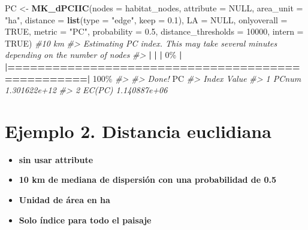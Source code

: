 \documentclass[
]{book}
\newenvironment{Shaded}{\begin{snugshade}}{\end{snugshade}}
\newcommand{\AttributeTok}[1]{\textcolor[rgb]{0.13,0.29,0.53}{#1}}
\newcommand{\CommentTok}[1]{\textcolor[rgb]{0.56,0.35,0.01}{\textit{#1}}}
\newcommand{\ConstantTok}[1]{\textcolor[rgb]{0.56,0.35,0.01}{#1}}
\newcommand{\DecValTok}[1]{\textcolor[rgb]{0.00,0.00,0.81}{#1}}
\newcommand{\ErrorTok}[1]{\textcolor[rgb]{0.64,0.00,0.00}{\textbf{#1}}}
\newcommand{\FloatTok}[1]{\textcolor[rgb]{0.00,0.00,0.81}{#1}}
\newcommand{\FunctionTok}[1]{\textcolor[rgb]{0.13,0.29,0.53}{\textbf{#1}}}
\newcommand{\NormalTok}[1]{#1}
\newcommand{\OtherTok}[1]{\textcolor[rgb]{0.56,0.35,0.01}{#1}}
\newcommand{\SpecialCharTok}[1]{\textcolor[rgb]{0.81,0.36,0.00}{\textbf{#1}}}
\newcommand{\StringTok}[1]{\textcolor[rgb]{0.31,0.60,0.02}{#1}}
\providecommand{\tightlist}{%
  \setlength{\itemsep}{0pt}\setlength{\parskip}{0pt}}
\begin{document}
\begin{Shaded}
\begin{Highlighting}[]
\NormalTok{PC }\OtherTok{\textless{}{-}} \FunctionTok{MK\_dPCIIC}\NormalTok{(}\AttributeTok{nodes =}\NormalTok{ habitat\_nodes,}
                \AttributeTok{attribute =} \ConstantTok{NULL}\NormalTok{,}
                \AttributeTok{area\_unit =} \StringTok{"ha"}\NormalTok{,}
                \AttributeTok{distance =} \FunctionTok{list}\NormalTok{(}\AttributeTok{type =} \StringTok{"edge"}\NormalTok{, }\AttributeTok{keep =} \FloatTok{0.1}\NormalTok{),}
                \AttributeTok{LA =} \ConstantTok{NULL}\NormalTok{,}
                \AttributeTok{onlyoverall =} \ConstantTok{TRUE}\NormalTok{,}
                \AttributeTok{metric =} \StringTok{"PC"}\NormalTok{,}
                \AttributeTok{probability =} \FloatTok{0.5}\NormalTok{,}
                \AttributeTok{distance\_thresholds =} \DecValTok{10000}\NormalTok{,}
                \AttributeTok{intern =} \ConstantTok{TRUE}\NormalTok{) }\CommentTok{\#10 km}
\CommentTok{\#\textgreater{} Estimating PC index. This may take several minutes depending on the number of nodes}
\CommentTok{\#\textgreater{} }
  \SpecialCharTok{|}                                                        
  \ErrorTok{|}                                                  \ErrorTok{|}   \DecValTok{0}\NormalTok{\%}
  \SpecialCharTok{|}                                                        
  \ErrorTok{|==================================================|} \DecValTok{100}\NormalTok{\%}
\CommentTok{\#\textgreater{} }
\CommentTok{\#\textgreater{} Done!}
\NormalTok{PC}
\CommentTok{\#\textgreater{}    Index        Value}
\CommentTok{\#\textgreater{} 1  PCnum 1.301622e+12}
\CommentTok{\#\textgreater{} 2 EC(PC) 1.140887e+06}
\end{Highlighting}
\end{Shaded}

\section{Ejemplo 2. Distancia euclidiana}\label{ejemplo-2.-distancia-euclidiana-1}

\begin{itemize}
\tightlist
\item
  \textbf{sin usar attribute}
\item
  \textbf{10 km de mediana de dispersión con una probabilidad de 0.5}
\item
  \textbf{Unidad de área en ha}
\item
  \textbf{Solo índice para todo el paisaje}
\end{itemize}
\end{document}
